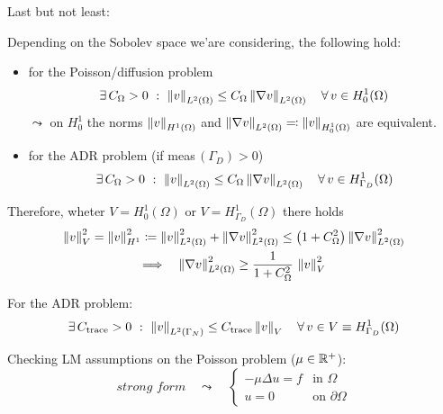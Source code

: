 Last but not least:

\begin{theorem}
Depending on the Sobolev space we'are considering, the following hold:

\begin{itemize}
    \item for the Poisson/diffusion problem
    \begin{equation}
    \label{eqn:PoincarePoisson}
    \exists\,C_\Omega>0\ :\ \left\lVert v \right\rVert_{L^2(\Omega)}\leq C_\Omega \left\lVert \nabla v \right\rVert_{L^2(\Omega)}\quad \forall\, v\in H^1_0(\Omega)
    \end{equation}
    $\leadsto$ on $H^1_0$ the norms $\left\lVert v \right\rVert_{H^1(\Omega)}$ and $\left\lVert \nabla v \right\rVert_{L^2(\Omega)}\eqcolon\left\lVert v \right\rVert_{H^1_0(\Omega)}$ are equivalent.
    \item for the ADR problem (if meas$\,\left(\Gamma_D\right)>0$)
    \begin{equation}
    \label{eqn:PoincareADR}
    \exists\,C_\Omega>0\ :\ \left\lVert v \right\rVert_{L^2(\Omega)}\leq C_\Omega \left\lVert \nabla v \right\rVert_{L^2(\Omega)}\quad \forall\, v\in H^1_{\Gamma_D}(\Omega)
    \end{equation}
\end{itemize}

Therefore, wheter $V=H^1_0(\Omega)$ or $V=H^1_{\Gamma_D}(\Omega)$ there holds
\begin{gather}
\left\lVert v \right\rVert_V^2=\left\lVert v \right\rVert_{H^1}^2\coloneq \left\lVert v \right\rVert_{L^2(\Omega)}^2+\left\lVert \nabla v \right\rVert_{L^2(\Omega)}^2 \leq \left( 1+C_\Omega^2 \right)\left\lVert \nabla v \right\rVert_{L^2(\Omega)}^2 \nonumber \\
\label{eqn:PoincareUsed}
\Longrightarrow \quad \left\lVert \nabla v \right\rVert_{L^2(\Omega)}^2 \geq \frac{1}{1+C_\Omega^2}\,\left\lVert v \right\rVert_V^2
\end{gather}

\end{theorem}\vspace{-0.2cm}

\begin{theorem}
For the ADR problem:
\begin{equation}
\label{eqn:traceADR}
\exists\,C_{\text{trace}}>0\ :\ \left\lVert v \right\rVert_{L^2(\Gamma_N)}\leq C_{\text{trace}} \left\lVert v \right\rVert_{V}\quad \forall\, v\in V\equiv H^1_{\Gamma_D}(\Omega)
\end{equation}
\end{theorem} \vspace{-0.2cm}

Checking LM assumptions on the Poisson problem ($\mu\in\mathbb{R}^+$):
\begin{equation*}
\label{eqn:PoissonproblemStrong}
\textit{strong form}\quad \leadsto\quad
\left\{
\begin{array}{ll}
-\mu \Delta u=f &\text{in }\Omega \\
u=0 &\text{on }\partial\Omega 
\end{array}
\right.
\end{equation*}

